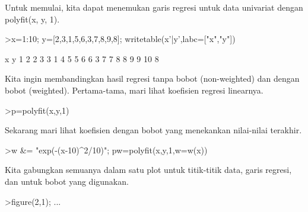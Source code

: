 \documentclass[12pt,arial,letterpaper]{book}
\begin{document}
\begin{eulercomment}
\begin{eulercomment}
\begin{eulercomment}
\begin{eulercomment}
\begin{eulercomment}
\begin{eulercomment}
\begin{eulercomment}
\begin{eulercomment}
\begin{eulercomment}
\begin{eulercomment}
\begin{eulercomment}
\begin{eulercomment}
\begin{eulercomment}
\begin{eulercomment}
\begin{eulercomment}
\begin{eulercomment}
\begin{eulercomment}
\begin{eulercomment}
\begin{eulercomment}
\begin{eulercomment}
\begin{eulercomment}
\begin{eulercomment}
\begin{eulercomment}
\begin{eulercomment}
\begin{eulercomment}
\begin{eulercomment}
\begin{eulercomment}
\begin{eulercomment}
\begin{eulercomment}
\begin{eulercomment}
\begin{eulercomment}
\begin{eulercomment}
\begin{eulercomment}
Untuk memulai, kita dapat menemukan garis regresi untuk data univariat
dengan polyfit(x, y, 1).
\end{eulercomment}
\begin{eulerprompt}
>x=1:10; y=[2,3,1,5,6,3,7,8,9,8]; writetable(x'|y',labc=["x","y"])
\end{eulerprompt}
\begin{euleroutput}
           x         y
           1         2
           2         3
           3         1
           4         5
           5         6
           6         3
           7         7
           8         8
           9         9
          10         8
\end{euleroutput}
\begin{eulercomment}
Kita ingin membandingkan hasil regresi tanpa bobot (non-weighted) dan
dengan bobot (weighted). Pertama-tama, mari lihat koefisien regresi
linearnya.
\end{eulercomment}
\begin{eulerprompt}
>p=polyfit(x,y,1)
\end{eulerprompt}
\begin{euleroutput}
  [0.733333,  0.812121]
\end{euleroutput}
\begin{eulercomment}
Sekarang mari lihat koefisien dengan bobot yang menekankan nilai-nilai
terakhir.
\end{eulercomment}
\begin{eulerprompt}
>w &= "exp(-(x-10)^2/10)"; pw=polyfit(x,y,1,w=w(x))
\end{eulerprompt}
\begin{euleroutput}
  [4.71566,  0.38319]
\end{euleroutput}
\begin{eulercomment}
Kita gabungkan semuanya dalam satu plot untuk titik-titik data, garis
regresi, dan untuk bobot yang digunakan.
\end{eulercomment}
\begin{eulerprompt}
>figure(2,1);  ...

\end{eulerprompt}
\end{eulercomment}
\end{eulercomment}
\end{eulercomment}
\end{eulercomment}
\end{eulercomment}
\end{eulercomment}
\end{eulercomment}
\end{eulercomment}
\end{eulercomment}
\end{eulercomment}
\end{eulercomment}
\end{eulercomment}
\end{eulercomment}
\end{eulercomment}
\end{eulercomment}
\end{eulercomment}
\end{eulercomment}
\end{eulercomment}
\end{eulercomment}
\end{eulercomment}
\end{eulercomment}
\end{eulercomment}
\end{eulercomment}
\end{eulercomment}
\end{eulercomment}
\end{eulercomment}
\end{eulercomment}
\end{eulercomment}
\end{eulercomment}
\end{eulercomment}
\end{eulercomment}
\end{eulercomment}
\end{document}
